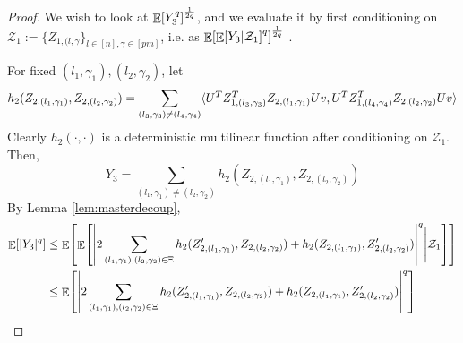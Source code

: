 \documentclass[11pt]{amsart}
\numberwithin{equation}{section}
\numberwithin{equation}{section}
\DeclareMathOperator{\E}{\mathbb{E}}
\DeclarePairedDelimiter{\abs}{\lvert}{\rvert}
\DeclarePairedDelimiter{\ip}{\langle}{\rangle}
\DeclarePairedDelimiter{\sqbr}{[}{]}
\begin{document}
\begin{proof}
We wish to look at $\E \sqbr*{Y_3^q}^\frac{1}{2q}$, and we evaluate it by first conditioning on $\mathcal{Z}_1 := \{ Z_{1, (l,\gamma} \}_{l \in [n], \gamma \in [pm]}$, i.e. as $\E \sqbr*{\E\sqbr*{Y_3 \vert \mathcal{Z}_1 }^q}^\frac{1}{2q}$ . 

For fixed $(l_1, \gamma_1), (l_2, \gamma_2)$, let \[ h_2(Z_{2,(l_1,\gamma_1)}, Z_{2,(l_2,\gamma_2)}) =  \sum_{ (l_3, \gamma_3) \neq (l_4, \gamma_4)} \ip{U^TZ^T_{1,(l_3,\gamma_3) }Z_{2,(l_1,\gamma_1)}Uv,U^TZ^T_{1,(l_4,\gamma_4) }Z_{2,(l_2, \gamma_2)}Uv} \] 
Clearly $h_2(\cdot, \cdot)$ is a deterministic multilinear function after conditioning on $\mathcal{Z}_1$. Then, 
\[ Y_3 = \sum_{ (l_1, \gamma_1) \neq (l_2, \gamma_2)} h_2(Z_{2,(l_1,\gamma_1)}, Z_{2,(l_2,\gamma_2)}) \]
By Lemma \ref{lem:masterdecoup}, 
\begin{align*}
    \E \sqbr{\abs{Y_3}^{q}} &\le \E \sqbr*{\E \sqbr*{\abs*{2 \sum_{ (l_1, \gamma_1), (l_2, \gamma_2) \in \Xi} h_2(Z'_{2,(l_1,\gamma_1)}, Z_{2,(l_2,\gamma_2)}) + h_2(Z_{2,(l_1,\gamma_1)}, Z'_{2,(l_2,\gamma_2)}) }^{q} \Bigg\vert \mathcal{Z}_1} } \\
    &\le \E \sqbr*{\abs*{2 \sum_{ (l_1, \gamma_1), (l_2, \gamma_2) \in \Xi} h_2(Z'_{2,(l_1,\gamma_1)}, Z_{2,(l_2,\gamma_2)}) + h_2(Z_{2,(l_1,\gamma_1)}, Z'_{2,(l_2,\gamma_2)}) }^{q} }  \\
\end{align*}


\end{proof}
\end{document}
